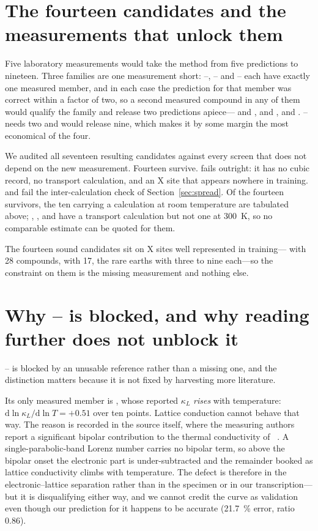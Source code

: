 \documentclass[preprint, 12pt]{elsarticle}
\begin{document}
\section{The fourteen candidates and the measurements that unlock them}
\label{sec:fourteen}

Five laboratory measurements would take the method from five predictions to nineteen. Three
families are one measurement short: --, -- and -- each
have exactly one measured member, and in each case the prediction for that member was correct
within a factor of two, so a second measured compound in any of them would qualify the family and
release two predictions apiece--- and ,  and ,
 and . -- needs two and would release nine, which makes it by
some margin the most economical of the four.

We audited all seventeen resulting candidates against every screen that does not depend on the new
measurement. Fourteen survive.  fails outright: it has no cubic record, no transport
calculation, and an X site that appears nowhere in training.  and  fail the
inter-calculation check of Section~\ref{sec:spread}. Of the fourteen survivors, the ten carrying a
calculation at room temperature are tabulated above; , ,  and
 have a transport calculation but not one at \SI{300}{\kelvin}, so no comparable estimate
can be quoted for them.

The fourteen sound candidates sit on X sites well represented in training--- with \num{28}
compounds,  with \num{17}, the rare earths with three to nine each---so the constraint on
them is the missing measurement and nothing else.

\section{Why -- is blocked, and why reading further does not unblock it}
\label{sec:nibi}

-- is blocked by an unusable reference rather than a missing one, and the distinction
matters because it is not fixed by harvesting more literature.

Its only measured member is , whose reported $\kappa_L$ \emph{rises} with temperature:
$\mathrm{d}\ln\kappa_L/\mathrm{d}\ln T = +\num{0.51}$ over ten points. Lattice conduction cannot
behave that way. The reason is recorded in the source itself, where the measuring authors report a
significant bipolar contribution to the thermal conductivity of ~\cite{li2015synthesis}.
A single-parabolic-band Lorenz number carries no bipolar term, so above the bipolar onset the
electronic part is under-subtracted and the remainder booked as lattice conductivity climbs with
temperature. The defect is therefore in the electronic--lattice separation rather than in the
specimen or in our transcription---but it is disqualifying either way, and we cannot credit the
curve as validation even though our prediction for it happens to be accurate (\SI{21.7}{\percent}
error, ratio \num{0.86}).
\end{document}
